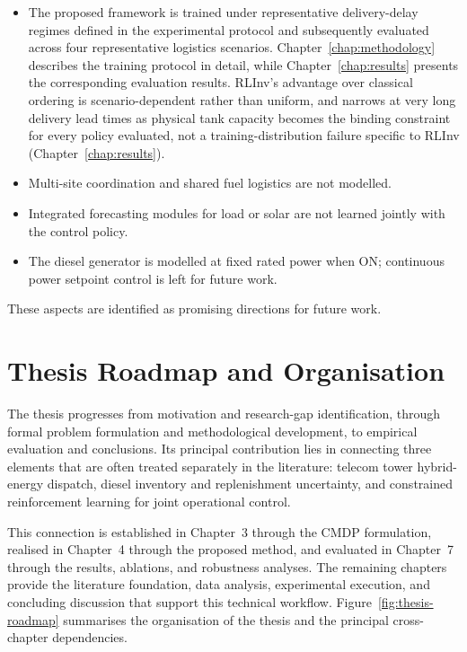 \begin{itemize}
  \item The proposed framework is trained under representative
  delivery-delay regimes defined in the experimental protocol and
  subsequently evaluated across four representative logistics scenarios.
  Chapter~\ref{chap:methodology} describes the training protocol in
  detail, while Chapter~\ref{chap:results} presents the corresponding
  evaluation results. RLInv's advantage over classical ordering is
  scenario-dependent rather than uniform, and narrows at very long delivery
  lead times as physical tank capacity becomes the binding constraint for
  every policy evaluated, not a training-distribution failure specific to
  RLInv (Chapter~\ref{chap:results}).
  \item Multi-site coordination and shared fuel logistics are not modelled.
  \item Integrated forecasting modules for load or solar are not learned jointly
  with the control policy.
  \item The diesel generator is modelled at fixed rated power when ON; continuous
  power setpoint control is left for future work.
\end{itemize}

These aspects are identified as promising directions for future work.
\section{Thesis Roadmap and Organisation}

The thesis progresses from motivation and research-gap identification,
through formal problem formulation and methodological development, to
empirical evaluation and conclusions. Its principal contribution lies
in connecting three elements that are often treated separately in the
literature: telecom tower hybrid-energy dispatch, diesel inventory and
replenishment uncertainty, and constrained reinforcement learning for
joint operational control.

This connection is established in Chapter~3 through the CMDP
formulation, realised in Chapter~4 through the proposed method, and
evaluated in Chapter~7 through the results, ablations, and robustness
analyses. The remaining chapters provide the literature foundation,
data analysis, experimental execution, and concluding discussion that
support this technical workflow. Figure~\ref{fig:thesis-roadmap}
summarises the organisation of the thesis and the principal
cross-chapter dependencies.

